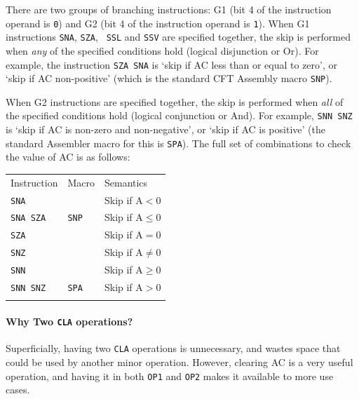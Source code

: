 \documentclass[11pt,a4paper,twocolumns]{article}
\newcommand\zebra{\rowcolors{2}{gray!20}{white}}
\newcommand\register[1]{\textsf{#1}}
\newcommand\A{\register{AC}}
\newcommand\Areg{\A}
\begin{document}
There are two groups of branching instructions: G1 (bit 4 of the
instruction operand is {\tt 0}) and G2 (bit 4 of the instruction
operand is {\tt 1}). When G1 instructions {\tt SNA}, {\tt SZA}, {\tt
  SSL} and {\tt SSV} are specified together, the skip is performed
when {\em any\/} of the specified conditions hold (logical disjunction
or Or). For example, the instruction {\tt SZA SNA} is ‘skip if \A{} less
than or equal to zero’, or ‘skip if \A{} non-positive’ (which is the
standard CFT Assembly macro {\tt SNP}).

When G2 instructions are specified together, the skip is performed
when {\em all\/} of the specified conditions hold (logical conjunction
or And). For example, {\tt SNN SNZ} is ‘skip if \A{} is non-zero and
non-negative’, or ‘skip if \A{} is positive’ (the standard Assembler
macro for this is {\tt SPA}). The full set of combinations to check
the value of \Areg{} is as follows:

\vspace{1em}\noindent\begin{center}
\zebra
\begin{tabular}{lll}
  Instruction & Macro & Semantics \\\noalign{\smallskip}\hline\noalign{\smallskip}
  {\tt SNA }     &           & Skip if $\mbox{A} < 0$ \\
  {\tt SNA SZA } & {\tt SNP} & Skip if $\mbox{A} \leq 0$ \\
  {\tt SZA }     &           & Skip if $\mbox{A} = 0$ \\
  {\tt SNZ }     &           & Skip if $\mbox{A} \not= 0$ \\
  {\tt SNN }     &           & Skip if $\mbox{A} \geq 0$ \\
  {\tt SNN SNZ } & {\tt SPA} & Skip if $\mbox{A} > 0$ \\
  \noalign{\smallskip}\hline\noalign{\smallskip}
\end{tabular}
\end{center}\vspace{1em}

\paragraph{Why Two {\tt CLA} operations?}
\label{sec-cla2}
Superficially, having two {\tt CLA} operations is unnecessary, and wastes
space that could be used by another minor operation. However, clearing
\A{} is a very useful operation, and having it in both {\tt OP1} and
  {\tt OP2} makes it available to more use cases.
\end{document}
